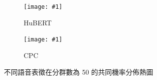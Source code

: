 {

\newcommand{\jeffheightt}[1]{\texttt{[image: \#1]}}

\begin{figure}
     \centering
     \begin{subfigure}{\textwidth}  %
         \centering
         \jeffheightt{figures/hubert-50-joint-byprob--new1.png}
         \caption{HuBERT}
         \label{fig:ch3-heatmap-model--hubert-50-joint-byprob}
     \end{subfigure}
     \vfill

     \begin{subfigure}{\textwidth}  %
         \centering
         \jeffheightt{figures/cpc-50-joint-byprob.png}
         \caption{CPC}
         \label{fig:ch3-heatmap-model--cpc-50-joint-byprob}
     \end{subfigure}

     \caption{不同語音表徵在分群數為 50 的共同機率分佈熱圖}
     \label{fig:ch3-heatmap-model-comparison--part1}
\end{figure}


\begin{figure}
    \ContinuedFloat
     \centering
     

\end{figure}}
